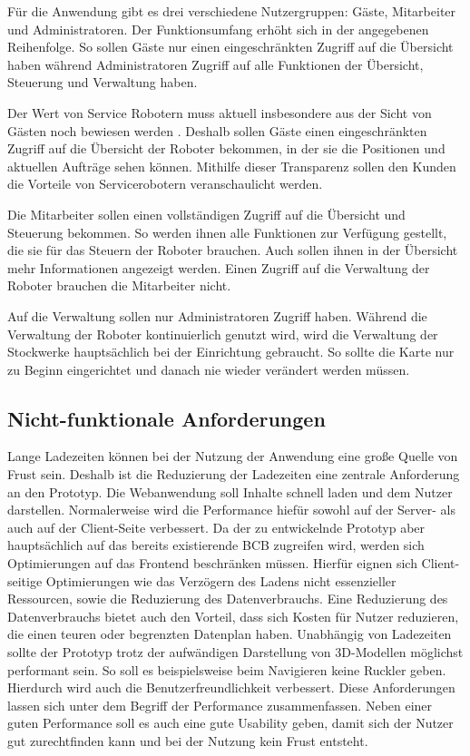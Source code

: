 Für die Anwendung gibt es drei verschiedene Nutzergruppen: Gäste, Mitarbeiter und Administratoren. Der Funktionsumfang erhöht sich in der angegebenen Reihenfolge. So sollen Gäste nur einen eingeschränkten Zugriff auf die Übersicht haben während Administratoren Zugriff auf alle Funktionen der Übersicht, Steuerung und Verwaltung haben.

Der Wert von Service Robotern muss aktuell insbesondere aus der Sicht von Gästen noch bewiesen werden \cite[S.~429]{Paluch2020}. Deshalb sollen Gäste einen eingeschränkten Zugriff auf die Übersicht der Roboter bekommen, in der sie die Positionen und aktuellen Aufträge sehen können. Mithilfe dieser Transparenz sollen den Kunden die Vorteile von Servicerobotern veranschaulicht werden.

Die Mitarbeiter sollen einen vollständigen Zugriff auf die Übersicht und Steuerung bekommen. So werden ihnen alle Funktionen zur Verfügung gestellt, die sie für das Steuern der Roboter brauchen. Auch sollen ihnen in der Übersicht mehr Informationen angezeigt werden. Einen Zugriff auf die Verwaltung der Roboter brauchen die Mitarbeiter nicht.

Auf die Verwaltung sollen nur Administratoren Zugriff haben. Während die Verwaltung der Roboter kontinuierlich genutzt wird, wird die Verwaltung der Stockwerke hauptsächlich bei der Einrichtung gebraucht. So sollte die Karte nur zu Beginn eingerichtet und danach nie wieder verändert werden müssen.

\subsection{Nicht-funktionale Anforderungen}
Lange Ladezeiten können bei der Nutzung der Anwendung eine große Quelle von Frust sein. Deshalb ist die Reduzierung der Ladezeiten eine zentrale Anforderung an den Prototyp. Die Webanwendung soll Inhalte schnell laden und dem Nutzer darstellen. Normalerweise wird die Performance hiefür sowohl auf der Server- als auch auf der Client-Seite verbessert. Da der zu entwickelnde Prototyp aber hauptsächlich auf das bereits existierende \ac{BCB} zugreifen wird, werden sich Optimierungen auf das Frontend beschränken müssen. Hierfür eignen sich Client-seitige Optimierungen wie das Verzögern des Ladens nicht essenzieller Ressourcen, sowie die Reduzierung des Datenverbrauchs. Eine Reduzierung des Datenverbrauchs bietet auch den Vorteil, dass sich Kosten für Nutzer reduzieren, die einen teuren oder begrenzten Datenplan haben. Unabhängig von Ladezeiten sollte der Prototyp trotz der aufwändigen Darstellung von 3D-Modellen möglichst performant sein. So soll es beispielsweise beim Navigieren keine Ruckler geben. Hierdurch wird auch die Benutzerfreundlichkeit verbessert. Diese Anforderungen lassen sich unter dem Begriff der Performance zusammenfassen. Neben einer guten Performance soll es auch eine gute Usability geben, damit sich der Nutzer gut zurechtfinden kann und bei der Nutzung kein Frust entsteht.

